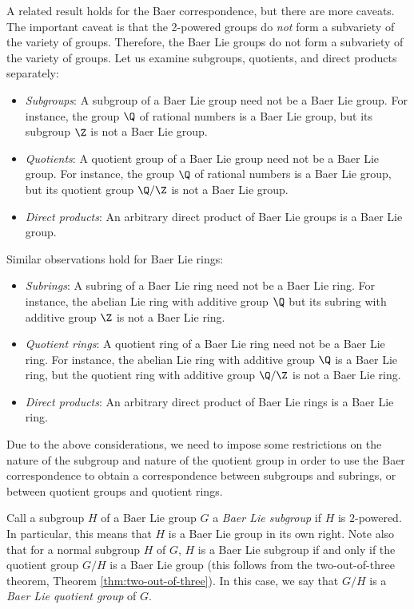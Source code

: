 \documentclass{ucetd}
\begin{document}
A related result holds for the Baer correspondence, but there are more
caveats. The important caveat is that the 2-powered groups do {\em
  not} form a subvariety of the variety of groups. Therefore, the Baer
Lie groups do not form a subvariety of the variety of groups. Let us
examine subgroups, quotients, and direct products separately:

\begin{itemize}
\item {\em Subgroups}: A subgroup of a Baer Lie group need not be a
  Baer Lie group. For instance, the group $\Q$ of rational numbers is
  a Baer Lie group, but its subgroup $\Z$ is not a Baer Lie group.
\item {\em Quotients}: A quotient group of a Baer Lie group need not
  be a Baer Lie group. For instance, the group $\Q$ of rational
  numbers is a Baer Lie group, but its quotient group $\Q/\Z$ is not a
  Baer Lie group.
\item {\em Direct products}: An arbitrary direct product of Baer Lie
  groups is a Baer Lie group.
\end{itemize}

Similar observations hold for Baer Lie rings:

\begin{itemize}
\item {\em Subrings}: A subring of a Baer Lie ring need not be a Baer
  Lie ring. For instance, the abelian Lie ring with additive group
  $\Q$ but its subring with additive group $\Z$ is not a Baer Lie ring.
\item {\em Quotient rings}: A quotient ring of a Baer Lie ring need
  not be a Baer Lie ring. For instance, the abelian Lie ring with
  additive group $\Q$ is a Baer Lie ring, but the quotient ring with
  additive group $\Q/\Z$ is not a Baer Lie ring.
\item {\em Direct products}: An arbitrary direct product of Baer Lie
  rings is a Baer Lie ring.
\end{itemize}

Due to the above considerations, we need to impose some restrictions
on the nature of the subgroup and nature of the quotient group in
order to use the Baer correspondence to obtain a correspondence
between subgroups and subrings, or between quotient groups and
quotient rings.

Call a subgroup $H$ of a Baer Lie group $G$ a {\em Baer Lie subgroup}
if $H$ is $2$-powered. In particular, this means that $H$ is a Baer
Lie group in its own right. Note also that for a normal subgroup $H$
of $G$, $H$ is a Baer Lie subgroup if and only if the quotient group
$G/H$ is a Baer Lie group (this follows from the two-out-of-three
theorem, Theorem \ref{thm:two-out-of-three}). In this case, we say
that $G/H$ is a {\em Baer Lie quotient group} of $G$.
\end{document}

